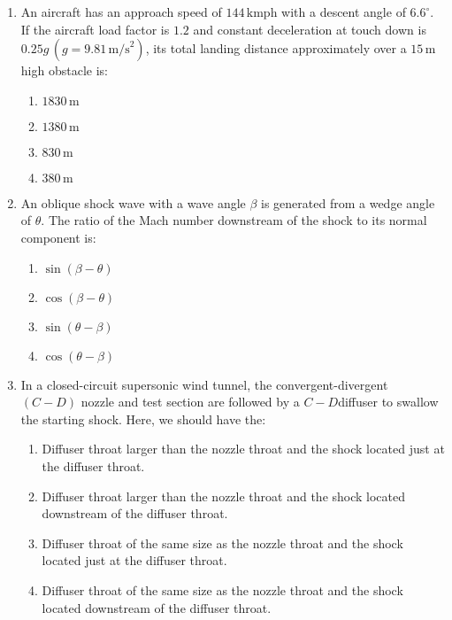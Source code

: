\documentclass[journal]{IEEEtran}
\newcommand{\brak}[1]{\left( #1 \right)}
\begin{document}
\begin{enumerate}
    \item An aircraft has an approach speed of $144 \, \text{kmph}$ with a descent angle of $ 6.6^\circ $. If the aircraft load factor is $1.2$ and constant deceleration at touch down is $0.25g \, \brak{g = 9.81 \, \text{m/s}^2} $, its total landing distance approximately over a $15 \, \text{m}$ high obstacle is:
    \begin{enumerate}
        \item $1830 \, \text{m}$
        \item $1380 \, \text{m}$
        \item $830 \, \text{m}$
        \item $380 \, \text{m}$
    \end{enumerate}

    \item An oblique shock wave with a wave angle $ \beta $ is generated from a wedge angle of $ \theta $. The ratio of the Mach number downstream of the shock to its normal component is:
    \begin{enumerate}
        \item $ \sin\brak{\beta - \theta} $
        \item $ \cos\brak{\beta - \theta} $
        \item $ \sin\brak{\theta - \beta} $
        \item $ \cos\brak{\theta - \beta} $
    \end{enumerate}

    \item In a closed-circuit supersonic wind tunnel, the convergent-divergent $\brak{C-D}$ nozzle and test section are followed by a $C-D$diffuser to swallow the starting shock. Here, we should have the:
    \begin{enumerate}
        \item Diffuser throat larger than the nozzle throat and the shock located just at the diffuser throat.
        \item Diffuser throat larger than the nozzle throat and the shock located downstream of the diffuser throat.
        \item Diffuser throat of the same size as the nozzle throat and the shock located just at the diffuser throat.
        \item Diffuser throat of the same size as the nozzle throat and the shock located downstream of the diffuser throat.
    \end{enumerate}


\end{enumerate}
\end{document}
